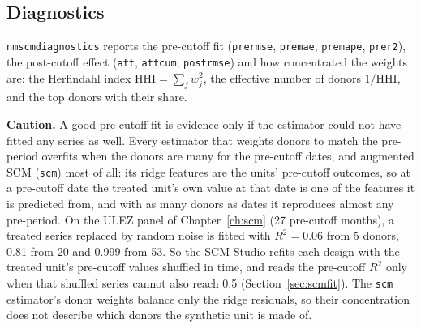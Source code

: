 \documentclass[11pt]{report}
\newcommand{\codeunderscore}{\textunderscore\allowbreak}
\newcommand{\code}[1]{\texttt{\let\_\codeunderscore #1}}
\newcommand{\caution}[1]{\par\noindent\colorbox{warn!15}{\parbox{0.97\linewidth}{\small\textbf{Caution.} #1}}\par}
\begin{document}
\subsection{Diagnostics}\label{sec:scmdiag}
\code{nm\_scm\_diagnostics} reports the pre-cutoff fit (\code{pre\_rmse}, \code{pre\_mae},
\code{pre\_mape}, \code{pre\_r2}), the post-cutoff effect (\code{att}, \code{att\_cum},
\code{post\_rmse}) and how concentrated the weights are: the Herfindahl index
$\text{HHI} = \sum_j w_j^2$, the effective number of donors $1/\text{HHI}$, and the top
donors with their share.

\caution{A good pre-cutoff fit is evidence only if the estimator could not have fitted
any series as well. Every estimator that weights donors to match the pre-period overfits
when the donors are many for the pre-cutoff dates, and augmented SCM (\code{scm}) most of
all: its ridge features are the units' pre-cutoff outcomes, so at a pre-cutoff date the
treated unit's own value at that date is one of the features it is predicted from, and
with as many donors as dates it reproduces almost any pre-period. On the ULEZ panel of
Chapter~\ref{ch:scm} (27 pre-cutoff months), a treated series replaced by random noise is
fitted with $R^2 = 0.06$ from 5 donors, 0.81 from 20 and 0.999 from 53. So the SCM Studio
refits each design with the treated unit's pre-cutoff values shuffled in time, and reads
the pre-cutoff $R^2$ only when that shuffled series cannot also reach 0.5
(Section~\ref{sec:scmfit}). The \code{scm} estimator's donor weights balance only the
ridge residuals, so their concentration does not describe which donors the synthetic unit
is made of.}
\end{document}
